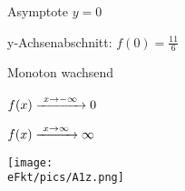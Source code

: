 \begin{Answer}[ref=eFktA1]
\begin{minipage}{\textwidth}
{\begin{minipage}{0.5\textwidth}
\begin{enumerate}[label=\alph*)]
				Asymptote \(y=0\)

				y-Achsenabschnitt: \(f(0)=\frac{11}{6}\)

				Monoton wachsend

				\(f(x)\xrightarrow{\hphantom{\ }x\to-\infty\hphantom{\ }}0\)

				\(f(x)\xrightarrow{\hphantom{\ }x\to\infty\hphantom{\ }}\infty\)

				\texttt{[image: \\eFkt/pics/A1z.png]}
			\end{enumerate}
		\end{minipage}}%
	\end{minipage}%
\end{Answer}